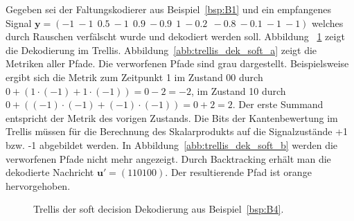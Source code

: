 \begin{beispiel}
Gegeben sei der Faltungskodierer aus Beispiel~\ref{bsp:B1} und ein empfangenes Signal $\mathbf{y}=\left( -1~-1~~0.5~-1~~0.9~-0.9~~1~-0.2~~-0.8~-0.1~-1~-1\right)$ welches durch Rauschen verfälscht wurde und dekodiert werden soll. Abbildung~ \ref{abb:trellis_dekodierung_soft} zeigt die Dekodierung im Trellis. Abbildung~\ref{abb:trellis_dek_soft_a} zeigt die Metriken aller Pfade. Die verworfenen Pfade sind grau dargestellt. Beispielsweise ergibt sich die Metrik zum Zeitpunkt 1 im Zustand 00 durch $0+\left( 1\cdot\left( -1\right) + 1\cdot\left( -1\right)\right) =0-2=-2$, im Zustand 10 durch $0+\left( \left( -1\right)\cdot\left( -1\right) + \left( -1\right)\cdot\left( -1\right)\right) =0+2=2$. Der erste Summand entspricht der Metrik des vorigen Zustands. Die Bits der Kantenbewertung im Trellis müssen für die Berechnung des Skalarprodukts auf die Signalzustände +1 bzw. -1 abgebildet werden. In Abbildung~\ref{abb:trellis_dek_soft_b} werden die verworfenen Pfade nicht mehr angezeigt. Durch Backtracking erhält man die dekodierte Nachricht $\mathbf{u'}=\left( 110100\right)$. Der resultierende Pfad ist orange hervorgehoben.
\label{bsp:B4}
\end{beispiel}

\begin{figure}[t]
	\centering
	\caption{Trellis der soft decision Dekodierung aus Beispiel~\ref{bsp:B4}.}
	\label{abb:trellis_dekodierung_soft}
\end{figure}

